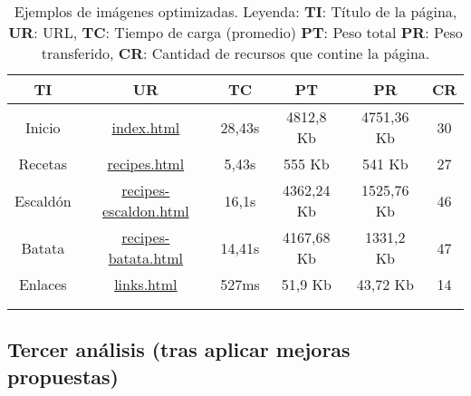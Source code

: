 \documentclass{article}
\begin{document}
\begin{longtable}{c|c|c|c|c|c}
    \hline
    \textbf{TI} & \textbf{UR} & \textbf{TC} & \textbf{PT} & \textbf{PR} & \textbf{CR} \\
    \endhead
    \hline
    Inicio & \href{https://www.danielramos.me/hhyc-dramosac/index.html}{index.html} & 28,43s & 4812,8 Kb & 4751,36 Kb & 30 \\
    Recetas & \href{https://www.danielramos.me/hhyc-dramosac/recipes.html}{recipes.html} & 5,43s & 555 Kb & 541 Kb & 27 \\
    Escaldón & \href{https://www.danielramos.me/hhyc-dramosac/recipes-escaldon.html}{recipes-escaldon.html} & 16,1s & 4362,24 Kb & 1525,76 Kb & 46 \\
    Batata & \href{https://www.danielramos.me/hhyc-dramosac/recipes-batata.html}{recipes-batata.html} & 14,41s & 4167,68 Kb & 1331,2 Kb & 47 \\
    Enlaces & \href{https://www.danielramos.me/hhyc-dramosac/links.html}{links.html} & 527ms & 51,9 Kb & 43,72 Kb & 14 \\
    \hline
     \\[1.5ex]
     \caption{
          Ejemplos de imágenes optimizadas.
          Leyenda: 
          \textbf{TI}: Título de la página, 
          \textbf{UR}: URL, 
          \textbf{TC}: Tiempo de carga (promedio) 
          \textbf{PT}: Peso total 
          \textbf{PR}: Peso transferido, 
          \textbf{CR}: Cantidad de recursos que contine la página.
     }
    \label{tab:imagenes-optimizadas}
\end{longtable}

\subsection{Tercer análisis (tras aplicar mejoras propuestas)}\label{sec:tercer-analisis}
\end{document}
